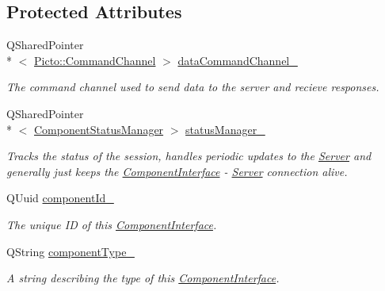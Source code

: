 \subsection*{Protected Attributes}
\begin{DoxyCompactItemize}
\item 
\hypertarget{class_component_interface_aadc9171c9dae8415d5663f69ce17378c}{Q\-Shared\-Pointer\\*
$<$ \hyperlink{class_picto_1_1_command_channel}{Picto\-::\-Command\-Channel} $>$ \hyperlink{class_component_interface_aadc9171c9dae8415d5663f69ce17378c}{data\-Command\-Channel\-\_\-}}\label{class_component_interface_aadc9171c9dae8415d5663f69ce17378c}

\begin{DoxyCompactList}\small\item\em The command channel used to send data to the server and recieve responses. \end{DoxyCompactList}\item 
\hypertarget{class_component_interface_acbc401183b1e3ad78397944628bf8e74}{Q\-Shared\-Pointer\\*
$<$ \hyperlink{class_component_status_manager}{Component\-Status\-Manager} $>$ \hyperlink{class_component_interface_acbc401183b1e3ad78397944628bf8e74}{status\-Manager\-\_\-}}\label{class_component_interface_acbc401183b1e3ad78397944628bf8e74}

\begin{DoxyCompactList}\small\item\em Tracks the status of the session, handles periodic updates to the \hyperlink{class_server}{Server} and generally just keeps the \hyperlink{class_component_interface}{Component\-Interface} -\/ \hyperlink{class_server}{Server} connection alive. \end{DoxyCompactList}\item 
\hypertarget{class_component_interface_a56beae2f457b7e5b735f0344db1d6b82}{Q\-Uuid \hyperlink{class_component_interface_a56beae2f457b7e5b735f0344db1d6b82}{component\-Id\-\_\-}}\label{class_component_interface_a56beae2f457b7e5b735f0344db1d6b82}

\begin{DoxyCompactList}\small\item\em The unique I\-D of this \hyperlink{class_component_interface}{Component\-Interface}. \end{DoxyCompactList}\item 
\hypertarget{class_component_interface_a51568b32bb6fc35706054b57bc5725a3}{Q\-String \hyperlink{class_component_interface_a51568b32bb6fc35706054b57bc5725a3}{component\-Type\-\_\-}}\label{class_component_interface_a51568b32bb6fc35706054b57bc5725a3}

\begin{DoxyCompactList}\small\item\em A string describing the type of this \hyperlink{class_component_interface}{Component\-Interface}. \end{DoxyCompactList}\end{DoxyCompactItemize}


